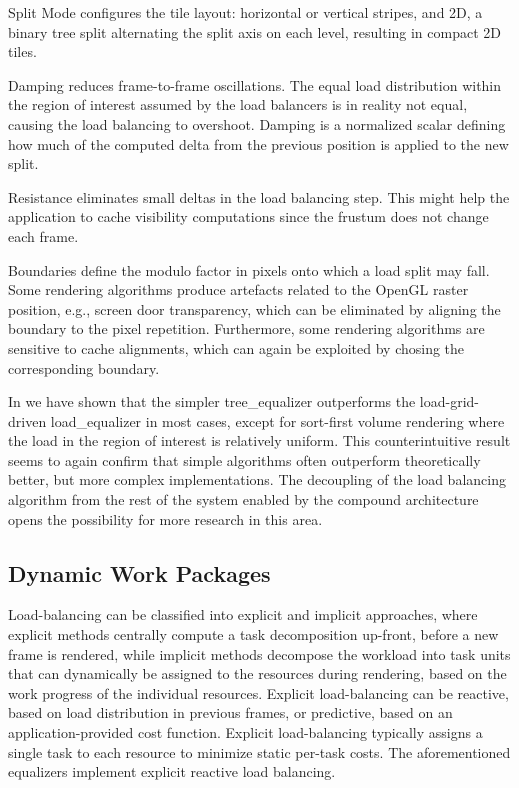 \begin{compactdesc}
\item[Split Mode] configures the tile layout: horizontal or vertical stripes,
and 2D, a binary tree split alternating the split axis on each level, resulting
in compact 2D tiles.
\item[Damping] reduces frame-to-frame oscillations. The equal load distribution
within the region of interest assumed by the load balancers is in reality not
equal, causing the load balancing to overshoot. Damping is a normalized scalar
defining how much of the computed delta from the previous position is applied to
the new split.
\item[Resistance] eliminates small deltas in the load balancing step. This might
help the application to cache visibility computations since the frustum does not
change each frame.
\item[Boundaries] define the modulo factor in pixels onto which a load split may
fall. Some rendering algorithms produce artefacts related to the OpenGL raster
position, e.g., screen door transparency, which can be eliminated by aligning
the boundary to the pixel repetition. Furthermore, some rendering algorithms are
sensitive to cache alignments, which can again be exploited by chosing the
corresponding boundary.
\end{compactdesc}

In \cite{ESP:18} we have shown that the simpler \textsf{tree\_equalizer}
outperforms the load-grid-driven \textsf{load\_equalizer} in most cases, except
for sort-first volume rendering where the load in the region of interest is
relatively uniform. This counterintuitive result seems to again confirm that
simple algorithms often outperform theoretically better, but more complex
implementations. The decoupling of the load balancing algorithm from the rest of
the system enabled by the compound architecture opens the possibility for more
research in this area.

\subsection{Dynamic Work Packages}

Load-balancing can be classified into explicit and implicit approaches, where
explicit methods centrally compute a task decomposition up-front, before a new
frame is rendered, while implicit methods decompose the workload into task units
that can dynamically be assigned to the resources during rendering, based on the
work progress of the individual resources. Explicit load-balancing can be
reactive, based on load distribution in previous frames, or predictive, based on
an application-provided cost function. Explicit load-balancing typically assigns
a single task to each resource to minimize static per-task costs.  The
aforementioned equalizers implement explicit reactive load balancing.

